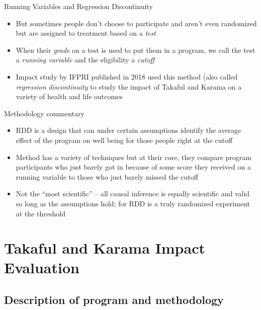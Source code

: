 \documentclass{beamer}
\begin{document}
\begin{frame}{Running Variables and Regression Discontinuity}
\begin{itemize}
\item But sometimes people don't choose to participate and aren't even randomized but are assigned to treatment based on a \emph{test}
\item When their \emph{grade} on a test is used to put them in a program, we call the test a \emph{running variable} and the eligibility a \emph{cutoff}
\item  Impact study by IFPRI published in 2018 used this method (also called \emph{regression discontinuity} to study the impact of Takaful and Karama on a variety of health and life outcomes
\end{itemize}
\end{frame}

\begin{frame}{Methodology commentary}

\begin{itemize}
\item RDD is a design that can under certain assumptions identify the average effect of the program on well being for those people right at the cutoff
\item Method has a variety of techniques but at their core, they compare program participants who just barely got in because of some score they received on a running variable to those who just barely missed the cutoff
\item Not the ``most scientific'' -- all causal inference is equally scientific and valid so long as the assumptions hold; for RDD is a truly randomized experiment at the threshold

\end{itemize}

\end{frame}


\section{Takaful and Karama Impact Evaluation}

\subsection{Description of program and methodology}
\end{document}
